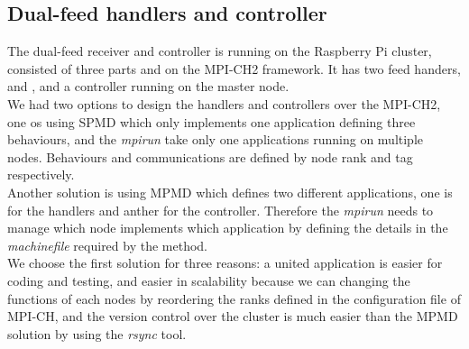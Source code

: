 \documentclass[11pt,openright,a4paper]{report}
\begin{document}
\subsection{Dual-feed handlers and controller}
The dual-feed receiver and controller is running on the Raspberry Pi cluster, consisted of three parts and on the MPI-CH2 framework. It has two feed handers,  and , and a controller running on the master node.\\
We had two options to design the handlers and controllers over the MPI-CH2, one os using SPMD which only implements one application defining three behaviours, and the \textit{mpirun} take only one applications running on multiple nodes. Behaviours and communications are defined by node rank and tag respectively. \\
Another solution is using MPMD which defines two different applications, one is for the handlers and anther for the controller. Therefore the \textit{mpirun} needs to manage which node implements which application by defining the details in the \textit{machinefile} required by the method.\\
We choose the first solution for three reasons: a united application is easier for coding and testing, and easier in scalability because we can changing the functions of each nodes by reordering the ranks defined in the configuration file of MPI-CH, and the version control over the cluster is much easier than the MPMD solution by using the \textit{rsync} tool.\\
\end{document}
